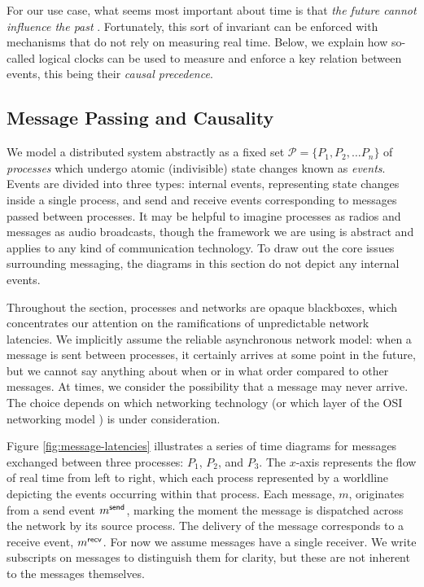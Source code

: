 \documentclass[]             %
{NASA}                       %
\theoremstyle{definition}
\begin{document}
For our use case, what seems most important about time is that
\emph{the future cannot influence the past}
\cite{1989mattern}. Fortunately, this sort of invariant can be
enforced with mechanisms that do not rely on measuring real
time. Below, we explain how so-called logical clocks can be used to
measure and enforce a key relation between events, this being their
\emph{causal precedence}.


\subsection{Message Passing and Causality}
\label{ssec:message-passing}
We model a distributed system abstractly as a fixed set
$\mathcal{P} = \{P_1, P_2, \ldots P_n\}$ of \emph{processes} which
undergo atomic (indivisible) state changes known as
\emph{events}. Events are divided into three types: internal events,
representing state changes inside a single process, and send and
receive events corresponding to messages passed between processes. It
may be helpful to imagine processes as radios and messages as audio
broadcasts, though the framework we are using is abstract and applies
to any kind of communication technology. To draw out the core issues
surrounding messaging, the diagrams in this section do not depict any
internal events.

Throughout the section, processes and networks are opaque blackboxes,
which concentrates our attention on the ramifications of unpredictable
network latencies. We implicitly assume the reliable asynchronous
network model: when a message is sent between processes, it certainly
arrives at some point in the future, but we cannot say anything about
when or in what order compared to other messages. At times, we
consider the possibility that a message may never arrive. The choice
depends on which networking technology (or which layer of the OSI
networking model \citationneeded) is under consideration.

Figure \ref{fig:message-latencies} illustrates a series of time
diagrams for messages exchanged between three processes: $P_1$, $P_2$,
and $P_3$. The $x$-axis represents the flow of real time from left to
right, which each process represented by a worldline depicting the
events occurring within that process. Each message, $m$, originates
from a send event $m_{}^{\mathsf{send}}$, marking the moment the message is
dispatched across the network by its source process. The delivery of
the message corresponds to a receive event, $m_{}^{\mathsf{recv}}$. For now we
assume messages have a single receiver. We write subscripts on
messages to distinguish them for clarity, but these are not inherent
to the messages themselves.
\end{document}
